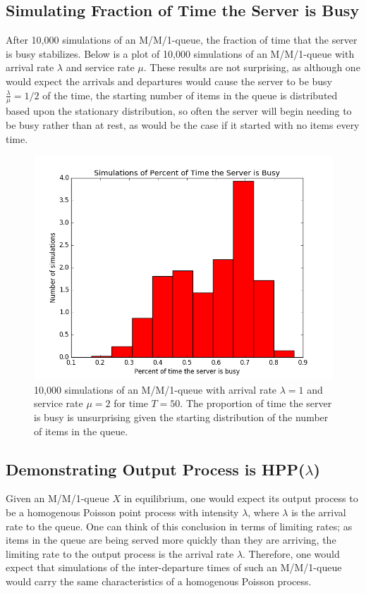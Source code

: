 \documentclass[11pt, oneside]{article}
\begin{document}
\subsection{Simulating Fraction of Time the Server is Busy}
After 10,000 simulations of an M/M/1-queue, the fraction of time that the server is busy stabilizes. Below is a plot of 10,000 simulations of an M/M/1-queue with arrival rate $\lambda$ and service rate $\mu$. These results are not surprising, as although one would expect the arrivals and departures would cause the server to be busy $\frac{\lambda}{\mu}=1/2$ of the time, the starting number of items in the queue is distributed based upon the stationary distribution, so often the server will begin needing to be busy rather than at rest, as would be the case if it started with no items every time.
\begin{figure}[H]
\includegraphics[scale=0.6]{busy_server}
\caption{10,000 simulations of an M/M/1-queue with arrival rate $\lambda=1$ and service rate $\mu=2$ for time $T=50$. The proportion of time the server is busy is unsurprising given the starting distribution of the number of items in the queue.}
\label{fig:x}
\end{figure}

\subsection{Demonstrating Output Process is HPP($\lambda$)}
Given an M/M/1-queue $X$ in equilibrium, one would expect its output process to be a homogenous Poisson point process with intensity $\lambda$, where $\lambda$ is the arrival rate to the queue. One can think of this conclusion in terms of limiting rates; as items in the queue are being served more quickly than they are arriving, the limiting rate to the output process is the arrival rate $\lambda$. Therefore, one would expect that simulations of the inter-departure times of such an M/M/1-queue would carry the same characteristics of a homogenous Poisson process. 
\end{document}
